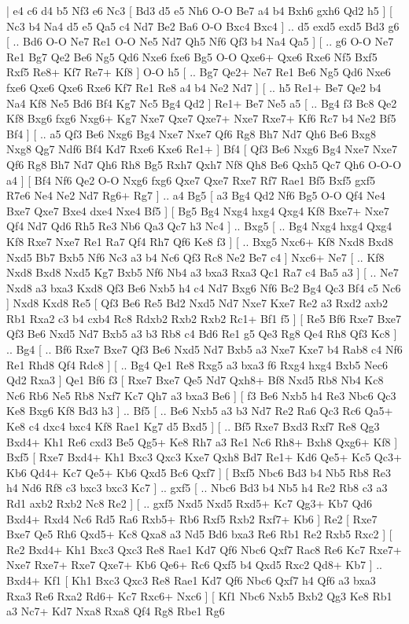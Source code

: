 \makegametitle 
|   e4   c6    d4   b5    Nf3   e6    Nc3 [  Bd3 d5  e5 Nh6  O-O Be7  a4 b4  Bxh6 gxh6  Qd2 h5   ]  [  Nc3 b4  Na4 d5  e5 Qa5  c4 Nd7  Be2 Ba6  O-O Bxc4  Bxc4   ] .. d5    exd5   exd5    Bd3   g6 [ .. Bd6  O-O Ne7  Re1 O-O  Ne5 Nd7  Qh5 Nf6  Qf3 b4  Na4 Qa5   ]  [ .. g6  O-O Ne7  Re1 Bg7  Qe2 Be6  Ng5 Qd6  Nxe6 fxe6  Bg5 O-O  Qxe6+ Qxe6  Rxe6 Nf5  Bxf5 Rxf5  Re8+ Kf7  Re7+ Kf8   ]  O-O   h5 [ .. Bg7  Qe2+ Ne7  Re1 Be6  Ng5 Qd6  Nxe6 fxe6  Qxe6 Qxe6  Rxe6 Kf7  Re1 Re8  a4 b4  Ne2 Nd7   ]  [ .. h5  Re1+ Be7  Qe2 b4  Na4 Kf8  Ne5 Bd6  Bf4 Kg7  Nc5 Bg4  Qd2   ]  Re1+   Be7    Ne5   a5 [ .. Bg4  f3 Bc8  Qe2 Kf8  Bxg6 fxg6  Nxg6+ Kg7  Nxe7 Qxe7  Qxe7+ Nxe7  Rxe7+ Kf6  Rc7 b4  Ne2 Bf5  Bf4   ]  [ .. a5  Qf3 Be6  Nxg6 Bg4  Nxe7 Nxe7  Qf6 Rg8  Bh7 Nd7  Qh6 Be6  Bxg8 Nxg8  Qg7 Ndf6  Bf4 Kd7  Rxe6 Kxe6  Re1+   ]  Bf4 [  Qf3 Be6  Nxg6 Bg4  Nxe7 Nxe7  Qf6 Rg8  Bh7 Nd7  Qh6 Rh8  Bg5 Rxh7  Qxh7 Nf8  Qh8 Be6  Qxh5 Qc7  Qh6 O-O-O  a4   ]  [  Bf4 Nf6  Qe2 O-O  Nxg6 fxg6  Qxe7 Qxe7  Rxe7 Rf7  Rae1 Bf5  Bxf5 gxf5  R7e6 Ne4  Ne2 Nd7  Rg6+ Rg7   ] .. a4    Bg5 [  a3 Bg4  Qd2 Nf6  Bg5 O-O  Qf4 Ne4  Bxe7 Qxe7  Bxe4 dxe4  Nxe4 Bf5   ]  [  Bg5 Bg4  Nxg4 hxg4  Qxg4 Kf8  Bxe7+ Nxe7  Qf4 Nd7  Qd6 Rh5  Re3 Nb6  Qa3 Qc7  h3 Nc4   ] .. Bxg5 [ .. Bg4  Nxg4 hxg4  Qxg4 Kf8  Rxe7 Nxe7  Re1 Ra7  Qf4 Rh7  Qf6 Ke8  f3   ]  [ .. Bxg5  Nxc6+ Kf8  Nxd8 Bxd8  Nxd5 Bb7  Bxb5 Nf6  Nc3 a3  b4 Nc6  Qf3 Rc8  Ne2 Be7  c4   ]  Nxc6+   Ne7 [ .. Kf8  Nxd8 Bxd8  Nxd5 Kg7  Bxb5 Nf6  Nb4 a3  bxa3 Rxa3  Qc1 Ra7  c4 Ba5  a3   ]  [ .. Ne7  Nxd8 a3  bxa3 Kxd8  Qf3 Be6  Nxb5 h4  c4 Nd7  Bxg6 Nf6  Bc2 Bg4  Qc3 Bf4  c5 Nc6   ]  Nxd8   Kxd8    Re5 [  Qf3 Be6  Re5 Bd2  Nxd5 Nd7  Nxe7 Kxe7  Re2 a3  Rxd2 axb2  Rb1 Rxa2  c3 b4  cxb4 Rc8  Rdxb2 Rxb2  Rxb2 Rc1+  Bf1 f5   ]  [  Re5 Bf6  Rxe7 Bxe7  Qf3 Be6  Nxd5 Nd7  Bxb5 a3  b3 Rb8  c4 Bd6  Re1 g5  Qe3 Rg8  Qe4 Rh8  Qf3 Kc8   ] .. Bg4 [ .. Bf6  Rxe7 Bxe7  Qf3 Be6  Nxd5 Nd7  Bxb5 a3  Nxe7 Kxe7  b4 Rab8  c4 Nf6  Re1 Rhd8  Qf4 Rdc8   ]  [ .. Bg4  Qe1 Re8  Rxg5 a3  bxa3 f6  Rxg4 hxg4  Bxb5 Nec6  Qd2 Rxa3   ]  Qe1   Bf6    f3 [  Rxe7 Bxe7  Qe5 Nd7  Qxh8+ Bf8  Nxd5 Rb8  Nb4 Kc8  Nc6 Rb6  Ne5 Rb8  Nxf7 Kc7  Qh7 a3  bxa3 Be6   ]  [  f3 Be6  Nxb5 h4  Re3 Nbc6  Qc3 Ke8  Bxg6 Kf8  Bd3 h3   ] .. Bf5 [ .. Be6  Nxb5 a3  b3 Nd7  Re2 Ra6  Qc3 Rc6  Qa5+ Ke8  c4 dxc4  bxc4 Kf8  Rae1 Kg7  d5 Bxd5   ]  [ .. Bf5  Rxe7 Bxd3  Rxf7 Re8  Qg3 Bxd4+  Kh1 Re6  cxd3 Be5  Qg5+ Ke8  Rh7 a3  Re1 Nc6  Rh8+ Bxh8  Qxg6+ Kf8   ]  Bxf5 [  Rxe7 Bxd4+  Kh1 Bxc3  Qxc3 Kxe7  Qxh8 Bd7  Re1+ Kd6  Qe5+ Kc5  Qc3+ Kb6  Qd4+ Kc7  Qe5+ Kb6  Qxd5 Bc6  Qxf7   ]  [  Bxf5 Nbc6  Bd3 b4  Nb5 Rb8  Re3 h4  Nd6 Rf8  c3 bxc3  bxc3 Kc7   ] .. gxf5 [ .. Nbc6  Bd3 b4  Nb5 h4  Re2 Rb8  c3 a3  Rd1 axb2  Rxb2 Nc8  Re2   ]  [ .. gxf5  Nxd5 Nxd5  Rxd5+ Kc7  Qg3+ Kb7  Qd6 Bxd4+  Rxd4 Nc6  Rd5 Ra6  Rxb5+ Rb6  Rxf5 Rxb2  Rxf7+ Kb6   ]  Re2 [  Rxe7 Bxe7  Qe5 Rh6  Qxd5+ Kc8  Qxa8 a3  Nd5 Bd6  bxa3 Re6  Rb1 Re2  Rxb5 Rxc2   ]  [  Re2 Bxd4+  Kh1 Bxc3  Qxc3 Re8  Rae1 Kd7  Qf6 Nbc6  Qxf7 Rac8  Re6 Kc7  Rxe7+ Nxe7  Rxe7+ Rxe7  Qxe7+ Kb6  Qe6+ Rc6  Qxf5 b4  Qxd5 Rxc2  Qd8+ Kb7   ] .. Bxd4+    Kf1 [  Kh1 Bxc3  Qxc3 Re8  Rae1 Kd7  Qf6 Nbc6  Qxf7 h4  Qf6 a3  bxa3 Rxa3  Re6 Rxa2  Rd6+ Kc7  Rxc6+ Nxc6   ]  [  Kf1 Nbc6  Nxb5 Bxb2  Qg3 Ke8  Rb1 a3  Nc7+ Kd7  Nxa8 Rxa8  Qf4 Rg8  Rbe1 Rg6 